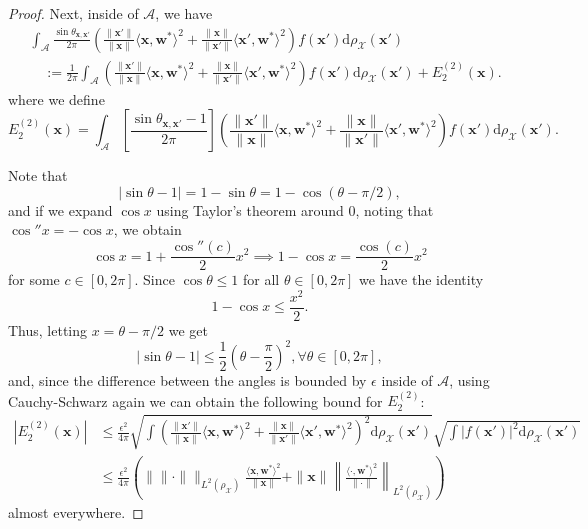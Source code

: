 \begin{proof}
    Next, inside of $\mathcal{A}$,  we have
    \begin{align*}
        &\int_{\mathcal A} \frac{\sin \theta_{\bm x, \bm x'}}{2\pi}\left(\frac{\|\bm x'\|}{\|\bm x\|}\langle \bm x, \bm w^*\rangle^2 + \frac{\|\bm x\|}{\|\bm x'\|}\langle \bm x', \bm w^*\rangle^2\right)f(\bm x')\mathrm d\rho_{\mathcal X}(\bm x') \\
        &\quad := \frac{1}{2 \pi}\int_{\mathcal A}\left(\frac{\|\bm x'\|}{\|\bm x\|}\langle \bm x, \bm w^*\rangle^2 + \frac{\|\bm x\|}{\|\bm x'\|}\langle \bm x', \bm w^*\rangle^2\right)f(\bm x')\mathrm d\rho_{\mathcal X}(\bm x') + E_2^{(2)}(\bm x).
    \end{align*}
    where we define
    \[
        E_2^{(2)}(\bm x) = \int_{\mathcal A} \left[\frac{\sin \theta_{\bm x, \bm x'}-1}{2\pi}\right] \left(\frac{\|\bm x'\|}{\|\bm x\|}\langle \bm x, \bm w^*\rangle^2 + \frac{\|\bm x\|}{\|\bm x'\|}\langle \bm x', \bm w^*\rangle^2\right)f(\bm x')\mathrm d\rho_{\mathcal X}(\bm x').
    \]

    Note that
    \[
        |\sin \theta - 1| = 1- \sin \theta  = 1 - \cos(\theta - \pi/2),
    \]
    and if we expand $\cos x$ using Taylor's theorem around $0$, noting that $\cos'' x = -\cos x$, we obtain
    \[
        \cos x = 1  + \frac{\cos''(c)}{2}x^2 \implies 1 - \cos x = \frac{\cos(c)}{2}x^2
    \]
    for some $c \in [0, 2\pi]$. Since $\cos \theta \leq 1$ for all $\theta \in [0, 2\pi]$ we have the identity
    \[
        1 - \cos x \leq \frac{x^2}{2}.
    \]
    Thus, letting $x = \theta - \pi/2$ we get
    \[
        |\sin \theta - 1| \leq \frac{1}{2}\left(\theta - \frac{\pi}{2}\right)^2, \forall \theta \in [0, 2\pi],
    \]
    and, since the difference between the angles is bounded by $\epsilon$ inside of $\mathcal A$, using Cauchy-Schwarz again we can obtain the following bound for $E_2^{(2)}$:
    \begin{align*}
        |E_2^{(2)}(\bm x)| &\leq \frac{\epsilon^2}{4\pi}\sqrt{\int \left(\frac{\|\bm x'\|}{\|\bm x\|}\langle \bm x, \bm w^*\rangle^2 + \frac{\|\bm x\|}{\|\bm x'\|}\langle \bm x', \bm w^*\rangle^2\right)^2\mathrm d\rho_{\mathcal X}(\bm x')} \sqrt{\int|f(\bm x')|^2\mathrm d\rho_{\mathcal X}(\bm x')}\\
        &\leq \frac{\epsilon^2}{4 \pi}\left(\Big\|\|\cdot\|\Big\|_{L^2(\rho_{\mathcal X})}\frac{\langle \bm x, \bm w^*\rangle^2}{\|\bm x\|} + \|\bm x \|\left\|\frac{\langle \cdot, \bm w^*\rangle^2}{\|\cdot\|}\right\|_{L^2(\rho_{\mathcal X})}\right)
    \end{align*}
    almost everywhere.


\end{proof}
